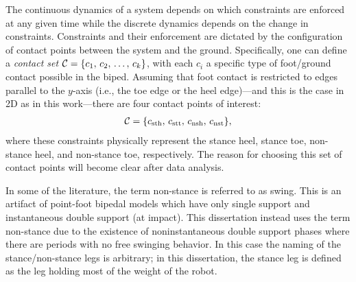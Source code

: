 The continuous dynamics of a system depends on which constraints are enforced at
any given time while the discrete dynamics depends on the change in
constraints.
%
Constraints and their enforcement are dictated by the configuration of contact
points between the system and the ground.
%
Specifically, one can define a {\em contact set} $\mathcal{C} = \{c_{1}, \, c_{2}, \,
\ldots, \, c_{k}\}$, with each $c_{i}$ a specific type of foot/ground contact
possible in the biped.
%
Assuming that foot contact is restricted to edges parallel to the $y$-axis
(i.e., the toe edge or the heel edge)---and this is the case in 2D as in this
work---there are four contact points of interest:
\begin{align*}
  \mathcal{C} =  \{c_{\mathrm{sth}}, \, c_{\mathrm{stt}}, \, c_{\mathrm{nsh}}, \, c_{\mathrm{nst}}\},
\end{align*}
where these constraints physically represent the stance heel, stance toe,
non-stance heel, and non-stance toe, respectively.
%
The reason for choosing this set of contact points will become clear after data
analysis.

\begin{remark}
  In some of the literature, the term non-stance is referred to as swing.
  This is an artifact of point-foot bipedal models which have only single
  support and instantaneous double support (at impact).
  This dissertation instead uses the term non-stance due to the existence of
  noninstantaneous double support phases where there are periods with no free
  swinging behavior.
  In this case the naming of the stance/non-stance legs is arbitrary;
  in this dissertation, the stance leg is defined as the leg holding most of the
  weight of the robot.
\end{remark}



